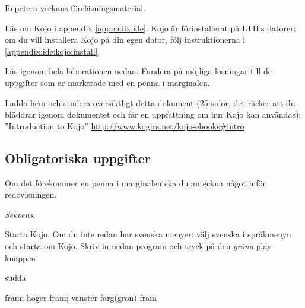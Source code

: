 
\Lab{\LabWeekONE}
%
\begin{Goals}

\end{Goals}

\begin{Preparations}
\item Repetera veckans föreläsningsmaterial.
\item {}%
\item Läs om Kojo i appendix \ref{appendix:ide}. Kojo är förinstallerat på LTH:s datorer; om du vill installera Kojo på din egen dator, följ instruktionerna i \ref{appendix:ide:kojo:install}.
\item Läs igenom hela laborationen nedan. Fundera på möjliga lösningar till de uppgifter som är markerade med en penna i marginalen.
\item Ladda hem och studera översiktligt detta dokument (25 sidor, det räcker att du bläddrar igenom dokumentet och får en uppfattning om hur Kojo kan användas): \\ ''Introduction to Kojo'' \url{http://www.kogics.net/kojo-ebooks#intro} 
\end{Preparations}

\subsection{Obligatoriska uppgifter}

Om det förekommer en penna i marginalen ska du anteckna något inför redovisningen. 


\Task \textit{Sekvens}.

\Subtask Starta Kojo. Om du inte redan har svenska menyer: välj svenska i språkmenyn och starta om Kojo.  Skriv in nedan program och tryck på den \emph{gröna} play-knappen. 

\begin{Code}
sudda

fram; höger
fram; vänster
färg(grön)
fram
\end{Code}
\noindent

